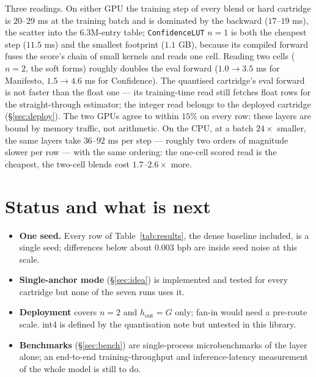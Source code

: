 \documentclass[11pt]{article}
\DeclareRobustCommand{\code}[1]{{\renewcommand{\_}{\textunderscore\allowbreak}\texttt{#1}}}
\begin{document}
Three readings. On either GPU the training step of every blend or hard cartridge is $20$--$29$ ms at the
training batch and is dominated by the backward ($17$--$19$ ms), the scatter into the $6.3$M-entry table;
\code{ConfidenceLUT} $n{=}1$ is both the cheapest step ($11.5$ ms) and the smallest footprint ($1.1$
GB), because its compiled forward fuses the score's chain of small kernels and reads one cell. Reading two
cells ($n{=}2$, the soft forms) roughly doubles the eval forward ($1.0\to3.5$ ms for Manifesto,
$1.5\to4.6$ ms for Confidence). The quantised cartridge's eval forward is not faster than the float one
--- its training-time read still fetches float rows for the straight-through estimator; the integer read
belongs to the deployed cartridge (\S\ref{sec:deploy}). The two GPUs agree to within $15\%$ on every row:
these layers are bound by memory traffic, not arithmetic. On the CPU, at a batch $24\times$ smaller, the
same layers take $36$--$92$ ms per step --- roughly two orders of magnitude slower per row --- with the
same ordering: the one-cell scored read is the cheapest, the two-cell blends cost $1.7$--$2.6\times$ more.

\section{Status and what is next}
\label{sec:status}
\begin{itemize}\itemsep1pt
\item \textbf{One seed.} Every row of Table~\ref{tab:results}, the dense baseline included, is a single
  seed; differences below about $0.003$ bpb are inside seed noise at this scale.
\item \textbf{Single-anchor mode} (\S\ref{sec:idea}) is implemented and tested for every cartridge but none
  of the seven runs uses it.
\item \textbf{Deployment} covers $n{=}2$ and $h_\text{out}=G$ only; fan-in would need a pre-route scale.
  int4 is defined by the quantisation note but untested in this library.
\item \textbf{Benchmarks} (\S\ref{sec:bench}) are single-process microbenchmarks of the layer alone; an
  end-to-end training-throughput and inference-latency measurement of the whole model is still to do.
\end{itemize}
\end{document}
